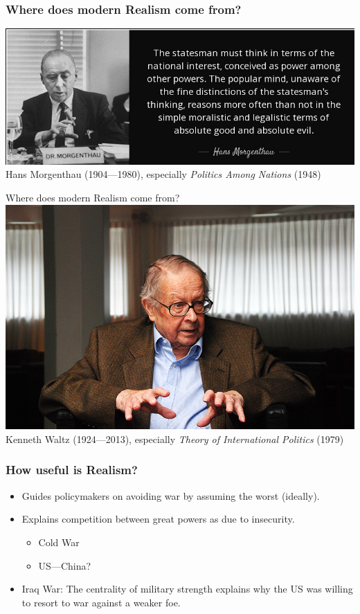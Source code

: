 \documentclass[handout]{beamer}
\begin{document}
\begin{frame} 
\frametitle{\LARGE{Where does modern Realism come from?}}
    \centering
\includegraphics[width=\textwidth,height=0.8\textheight,keepaspectratio]{morgenthau.jpg}
Hans Morgenthau (1904---1980), especially \textit{Politics Among Nations} (1948)
\end{frame}

\begin{frame}{\LARGE Where does modern Realism come from?}
    \centering
\includegraphics[width=\textwidth,height=0.8\textheight,keepaspectratio]{waltz.jpg}
Kenneth Waltz (1924---2013), especially \textit{Theory of International Politics} (1979)
\end{frame}

\begin{frame} 
\frametitle{\LARGE{How useful is Realism?}}
    \begin{itemize}
        \item Guides policymakers on avoiding war by assuming the worst (ideally). \pause
        \item Explains competition between great powers as due to insecurity. \pause
        \begin{itemize}
            \item Cold War \pause
            \item US---China? \pause
        \end{itemize}
        \item Iraq War: The centrality of military strength explains why the US was willing to resort to war against a weaker foe.
    \end{itemize}
\end{frame}
\end{document}
